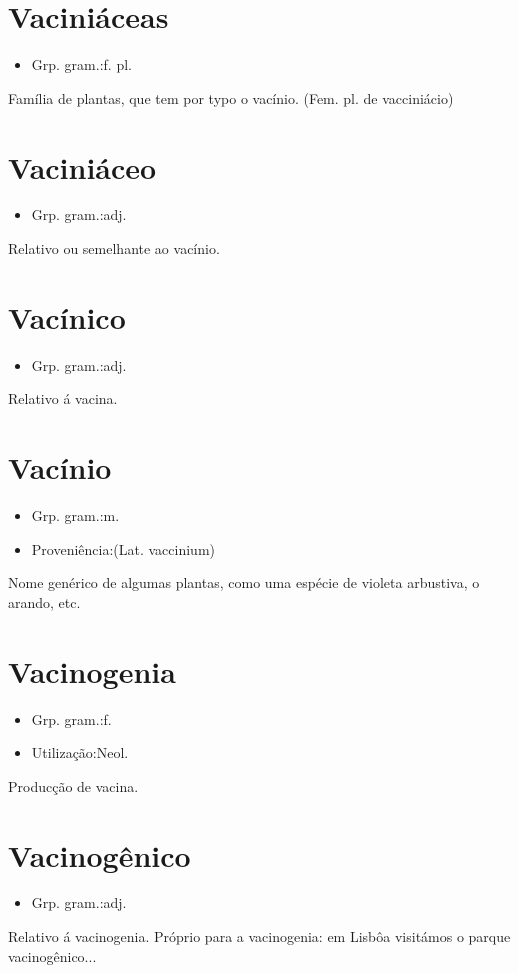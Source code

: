 \documentclass{article}
\begin{document}
\section{Vaciniáceas}
\begin{itemize}
\item {Grp. gram.:f. pl.}
\end{itemize}
Família de plantas, que tem por typo o vacínio.
(Fem. pl. de \textunderscore vacciniácio\textunderscore )
\section{Vaciniáceo}
\begin{itemize}
\item {Grp. gram.:adj.}
\end{itemize}
Relativo ou semelhante ao vacínio.
\section{Vacínico}
\begin{itemize}
\item {Grp. gram.:adj.}
\end{itemize}
Relativo á vacina.
\section{Vacínio}
\begin{itemize}
\item {Grp. gram.:m.}
\end{itemize}
\begin{itemize}
\item {Proveniência:(Lat. \textunderscore vaccinium\textunderscore )}
\end{itemize}
Nome genérico de algumas plantas, como uma espécie de violeta arbustiva, o arando, etc.
\section{Vacinogenia}
\begin{itemize}
\item {Grp. gram.:f.}
\end{itemize}
\begin{itemize}
\item {Utilização:Neol.}
\end{itemize}
Producção de vacina.
\section{Vacinogênico}
\begin{itemize}
\item {Grp. gram.:adj.}
\end{itemize}
Relativo á vacinogenia.
Próprio para a vacinogenia: \textunderscore em Lisbôa visitámos o parque vacinogênico...\textunderscore 
\end{document}
